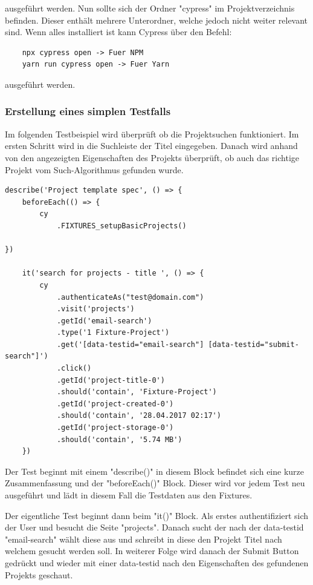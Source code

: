 ausgeführt werden.
Nun sollte sich der Ordner "cypress" im Projektverzeichnis befinden. Dieser enthält mehrere Unterordner, welche jedoch nicht weiter relevant sind. Wenn alles installiert ist kann Cypress über den Befehl:

\begin{lstlisting}
    npx cypress open -> Fuer NPM
    yarn run cypress open -> Fuer Yarn
\end{lstlisting}

ausgeführt werden.
\cite{Integration_von_Cypress}

\subsubsection{Erstellung eines simplen Testfalls}
Im folgenden Testbeispiel wird überprüft ob die Projektsuchen funktioniert. Im ersten Schritt wird in die Suchleiste der Titel eingegeben. Danach wird anhand von den angezeigten Eigenschaften des Projekts überprüft, ob auch das richtige Projekt vom Such-Algorithmus gefunden wurde. 

\begin{lstlisting}
describe('Project template spec', () => {
    beforeEach(() => {
        cy
            .FIXTURES_setupBasicProjects()

})
    
    it('search for projects - title ', () => {
        cy
            .authenticateAs("test@domain.com")
            .visit('projects')
            .getId('email-search')
            .type('1 Fixture-Project')
            .get('[data-testid="email-search"] [data-testid="submit-search"]')
            .click()
            .getId('project-title-0')
            .should('contain', 'Fixture-Project')
            .getId('project-created-0')
            .should('contain', '28.04.2017 02:17')
            .getId('project-storage-0')
            .should('contain', '5.74 MB')
    })
\end{lstlisting}

Der Test beginnt mit einem "describe()" in diesem Block befindet sich eine kurze Zusammenfassung und der "beforeEach()" Block. Dieser wird vor jedem Test neu ausgeführt und lädt in diesem Fall die Testdaten aus den Fixtures.

Der eigentliche Test beginnt dann beim "it()" Block. Als erstes authentifiziert sich der User und besucht die Seite "projects". Danach sucht der nach der data-testid "email-search" wählt diese aus und schreibt in diese den Projekt Titel nach welchem gesucht werden soll. In weiterer Folge wird danach der Submit Button gedrückt und wieder mit einer data-testid nach den Eigenschaften des gefundenen Projekts geschaut.

